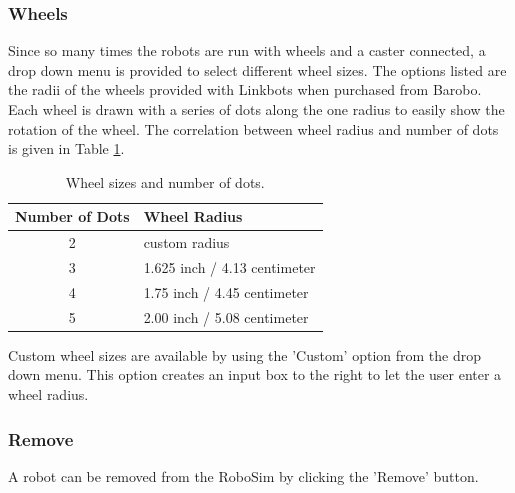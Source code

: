 \documentclass{article}
\begin{document}
\subsubsection{Wheels}
Since so many times the robots are run with wheels and a caster connected, a
drop down menu is provided to select different wheel sizes.  The options listed
are the radii of the wheels provided with Linkbots when purchased from Barobo.
Each wheel is drawn with a series of dots along the one radius to easily show
the rotation of the wheel.  The correlation between wheel radius and number of
dots is given in Table \ref{tab:wheels}.
\begin{table}[H]
	\begin{center}
	\begin{tabular}{c | l }
		\hline \hline
		\textbf{Number of Dots} & \textbf{Wheel Radius} \\ \hline
		2 & custom radius \\
		3 & 1.625 inch / 4.13 centimeter \\
		4 & 1.75 inch / 4.45 centimeter \\
		5 & 2.00 inch / 5.08 centimeter \\
		\hline \hline
	\end{tabular}
	\caption{Wheel sizes and number of dots.}
	\label{tab:wheels}
	\end{center}
\end{table}

Custom wheel sizes are available by using the 'Custom' option from the drop down
menu.  This option creates an input box to the right to let the user enter a
wheel radius.

\subsubsection{Remove}
A robot can be removed from the RoboSim by clicking the 'Remove' button. 
\end{document}
